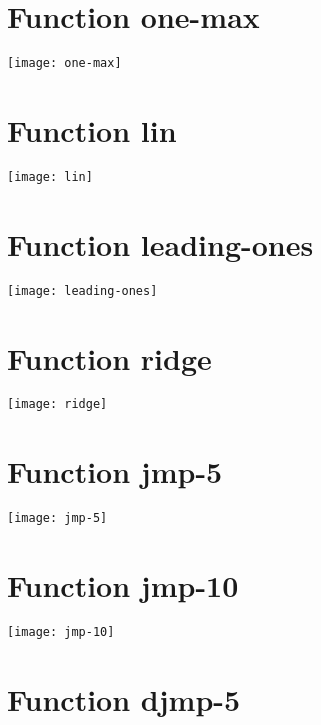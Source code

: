 \graphicspath{{../graphics/}}

\section{Function one-max}

\begin{center}
\texttt{[image: one-max]}
\end{center}

\section{Function lin}

\begin{center}
\texttt{[image: lin]}
\end{center}

\section{Function leading-ones}

\begin{center}
\texttt{[image: leading-ones]}
\end{center}

\section{Function ridge}

\begin{center}
\texttt{[image: ridge]}
\end{center}

\section{Function jmp-5}

\begin{center}
\texttt{[image: jmp-5]}
\end{center}

\section{Function jmp-10}

\begin{center}
\texttt{[image: jmp-10]}
\end{center}

\section{Function djmp-5}

